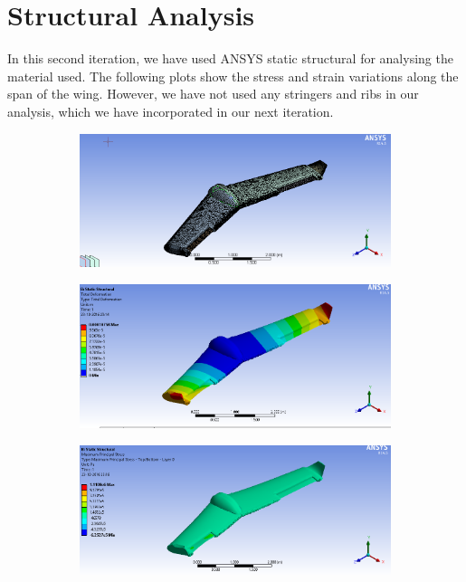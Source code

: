 \section{Structural Analysis}
In this second iteration, we have used ANSYS static structural for analysing the material used. The following plots show the stress and strain variations along the span of the wing.
However, we have not used any stringers and ribs in our analysis, which we  have incorporated in our next iteration.
\begin{figure}[H]
\begin{subfigure}{0.48\textwidth}
\includegraphics[width = \linewidth]{iter2_mesh.png}
\end{subfigure}
\begin{subfigure}{0.48\textwidth}
\includegraphics[width = \linewidth]{iter2_tot_def.png}
\end{subfigure}
\medskip
\begin{subfigure}{0.48\textwidth}
\includegraphics[width = \linewidth]{iter2_max_stress.png}

\end{subfigure}
\end{figure}

